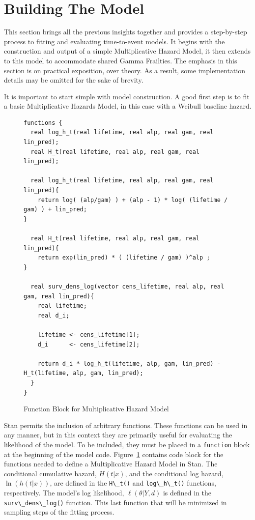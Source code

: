 \section*{Building The Model}

This section brings all the previous insights together and provides a step-by-step process to fitting and evaluating time-to-event models. It begins with the construction and output of a simple Multiplicative Hazard Model, it then extends to this model to accommodate shared Gamma Frailties. The emphasis in this section is on practical exposition, over theory. As a result, some implementation details may be omitted for the sake of brevity. 

It is important to start simple with model construction. A good first step is to fit a basic Multiplicative Hazards Model, in this case with a Weibull baseline hazard. 

\begin{figure}[htbp]
    \centering
    \begin{lstlisting}[belowskip=-2 \baselineskip]
functions {
  real log_h_t(real lifetime, real alp, real gam, real lin_pred);
  real H_t(real lifetime, real alp, real gam, real lin_pred);

  real log_h_t(real lifetime, real alp, real gam, real lin_pred){
    return log( (alp/gam) ) + (alp - 1) * log( (lifetime / gam) ) + lin_pred;
}

  real H_t(real lifetime, real alp, real gam, real lin_pred){
    return exp(lin_pred) * ( (lifetime / gam) )^alp ;
}

  real surv_dens_log(vector cens_lifetime, real alp, real gam, real lin_pred){
    real lifetime;
    real d_i;
  
    lifetime <- cens_lifetime[1];
    d_i      <- cens_lifetime[2];
    
    return d_i * log_h_t(lifetime, alp, gam, lin_pred) - H_t(lifetime, alp, gam, lin_pred);
  }
}
    \end{lstlisting}
    \caption{Function Block for Multiplicative Hazard Model}
    \label{mhazm_funs}
\end{figure}


Stan permits the inclusion of arbitrary functions. These functions can be used in any manner, but in this context they are primarily useful for evaluating the likelihood of the model. To be included, they must be placed in a \lstinline{function} block at the beginning of the model code. Figure~\ref{mhazm_funs} contains code block for the functions needed to define a Multiplicative Hazard Model in Stan. The conditional cumulative hazard, $H(t|x)$, and the conditional log hazard, $\ln(h(t|x))$, are defined in the \lstinline{H\_t()} and \lstinline{log\_h\_t()} functions, respectively. The model's log likelihood, $\ell(\theta|Y, d)$ is defined in the \lstinline{surv\_dens\_log()} function. This last function that will be minimized in sampling steps of the fitting process. 

